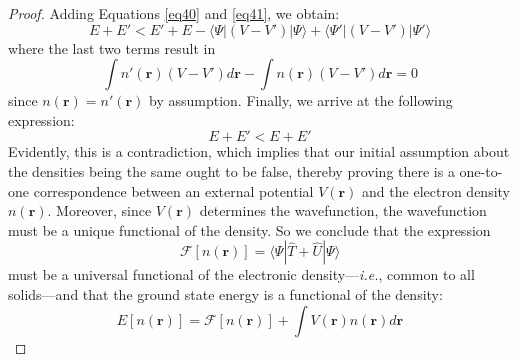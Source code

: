 \begin{proof}
  Adding Equations \ref{eq40} and \ref{eq41}, we obtain:
  \begin{equation}
    \label{eq42}
    E + E' < E' + E - \langle \Psi|(V - V')|\Psi\rangle + \langle \Psi'|(V - V')|\Psi'\rangle
  \end{equation}
  where the last two terms result in 
  \begin{equation}
    \label{eq43}
    \int n'(\mathbf{r}) (V - V') d\mathbf{r} - \int n(\mathbf{r}) (V - V') d\mathbf{r} = 0
  \end{equation}
  since $n(\mathbf{r})=n'(\mathbf{r})$ by assumption. Finally, we arrive at the following expression: 
  \begin{equation}
    \label{eq44}
    E + E' < E + E'
  \end{equation}
  Evidently, this is a contradiction, which implies that our initial assumption about the densities being the same ought to be false, thereby proving there is a one-to-one correspondence between an external potential $V(\mathbf{r})$ and the electron density $n(\mathbf{r})$. Moreover, since $V(\mathbf{r})$ determines the wavefunction, the wavefunction must be a unique functional of the density. So we conclude that the expression  
  \begin{equation}
    \label{eq45}
    \mathcal{F}[n(\mathbf{r})] = \langle \Psi |\hat{T} + \hat{U} |\Psi \rangle 
  \end{equation}
  must be a universal functional of the electronic density---\emph{i.e.}, common to all solids---and that the ground state energy is a functional of the density: 
  \begin{equation}
    \label{eq46}
    E[n(\mathbf{r})] = \mathcal{F}[n(\mathbf{r})] + \int V(\mathbf{r}) n(\mathbf{r}) d\mathbf{r}
  \end{equation}
\end{proof}

